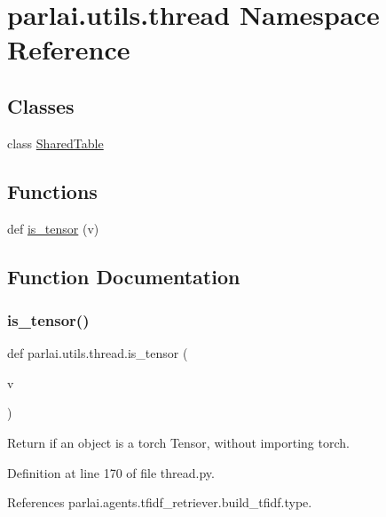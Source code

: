 \hypertarget{namespaceparlai_1_1utils_1_1thread}{}\section{parlai.\+utils.\+thread Namespace Reference}
\label{namespaceparlai_1_1utils_1_1thread}
\subsection*{Classes}
\begin{DoxyCompactItemize}
\item 
class \hyperlink{classparlai_1_1utils_1_1thread_1_1SharedTable}{Shared\+Table}
\end{DoxyCompactItemize}
\subsection*{Functions}
\begin{DoxyCompactItemize}
\item 
def \hyperlink{namespaceparlai_1_1utils_1_1thread_ad2b01da95ecdc33d8dce76a79f48137f}{is\+\_\+tensor} (v)
\end{DoxyCompactItemize}


\subsection{Function Documentation}
\mbox{\label{namespaceparlai_1_1utils_1_1thread_ad2b01da95ecdc33d8dce76a79f48137f}} 
\subsubsection{\texorpdfstring{is\+\_\+tensor()}{is\_tensor()}}
{\footnotesize\ttfamily def parlai.\+utils.\+thread.\+is\+\_\+tensor (\begin{DoxyParamCaption}\item[{}]{v }\end{DoxyParamCaption})}

\begin{DoxyVerb}Return if an object is a torch Tensor, without importing torch.\end{DoxyVerb}
 

Definition at line 170 of file thread.\+py.



References parlai.\+agents.\+tfidf\+\_\+retriever.\+build\+\_\+tfidf.\+type.

